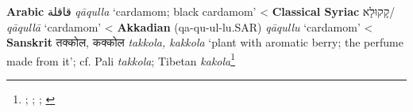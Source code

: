 \begin{etymology}\label{ety:qaqulla}
\textbf{Arabic} {قاقلة} \textit{qāqulla} `cardamom; black cardamom'
< \textbf{Classical Syriac} {{קָקוּלָא}/} \textit{qāqullā} `cardamom'
< \textbf{Akkadian} { (qa-qu-ul-lu.SAR)} \textit{qāqullu} `cardamom'
< \textbf{Sanskrit} {तक्कोल, कक्कोल} \textit{takkola, kakkola} `plant with aromatic berry; the perfume made from it'; cf. Pali \textit{takkola}; Tibetan  \textit{kakola}\footnote{\textcite[863]{wehr_dictionary_1976}; \textcite[vol. 1, p. 489]{low_flora_1924}; \textcite[58]{zimmern_akkadische_1915}; \textcite[431, 241]{monier-williams_sanskrit-english_1899}}
\end{etymology}